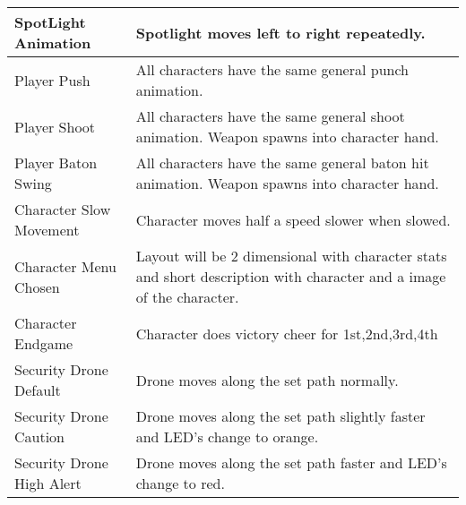 \documentclass[10pt]{report}
\begin{document}
\begin{center}
\begin{tabular}{| p{.45\linewidth} | p{.45\linewidth} |}
        SpotLight Animation &        Spotlight moves left to right repeatedly.  \\ \hline
        Player Push     &        All characters have the same general punch animation.      \\ \hline
        Player Shoot    &        All characters have the same general shoot animation. Weapon spawns into character hand.   \\ \hline
        Player Baton Swing  &        All characters have the same general baton hit animation.  Weapon spawns into character hand.  \\ \hline
        Character Slow Movement     &        Character moves half a speed slower when slowed.   \\ \hline
        Character Menu Chosen   &        Layout will be 2 dimensional with character stats and short description with character and a image of the character.   \\ \hline
        Character Endgame   &        Character does victory cheer for 1st,2nd,3rd,4th       \\ \hline
        Security Drone Default  &        Drone moves along the set path normally.   \\ \hline
        Security Drone Caution  &        Drone moves along the set path slightly faster and LED’s change to orange.     \\ \hline
        Security Drone High Alert    &        Drone moves along the set path faster and LED’s change to red.     \\ \hline
    \end{tabular}
\end{center}

\end{document}

